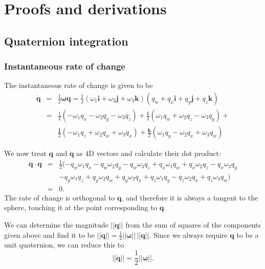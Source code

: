 \chapter{Proofs and derivations\label{proofs}}
\section{Quaternion integration\label{quatProofs}}
\subsection{Instantaneous rate of change\label{quatRateOfChangeOrthogonal}}
The instantaneous rate of change is given to be
\begin{eqnarray*}
\dot{\mathbf{q}} & = & \frac{1}{2}\bm{\omega}\mathbf{q} =
    \frac{1}{2}(\omega_1\mathbf{i} + \omega_2\mathbf{j} + \omega_3\mathbf{k})
    (q_w + q_x\mathbf{i} + q_y\mathbf{j} + q_z\mathbf{k}) \\
& = & \frac{1}{2} ( - \omega_1 q_x - \omega_2 q_y - \omega_3 q_z ) +
    \frac{\mathbf{i}}{2} ( \omega_1 q_w + \omega_2 q_z - \omega_3 q_y ) + \\
&&  \frac{\mathbf{j}}{2} (-\omega_1 q_z + \omega_2 q_w + \omega_3 q_x ) +
    \frac{\mathbf{k}}{2} ( \omega_1 q_y - \omega_2 q_x + \omega_3 q_w )
\end{eqnarray*}

We now treat $\mathbf{q}$ and $\dot{\mathbf{q}}$ as 4D vectors and calculate
their dot product:
\begin{eqnarray*}
\mathbf{q}\cdot\dot{\mathbf{q}} & = & \frac{1}{2} (
    - q_w \omega_1 q_x - q_w \omega_2 q_y - q_w \omega_3 q_z
    + q_x \omega_1 q_w + q_x \omega_2 q_z - q_x \omega_3 q_y \\
&&  - q_y \omega_1 q_z + q_y \omega_2 q_w + q_y \omega_3 q_x
    + q_z \omega_1 q_y - q_z \omega_2 q_x + q_z \omega_3 q_w ) \\
& = & 0.
\end{eqnarray*}
The rate of change is orthogonal to $\mathbf{q}$, and therefore it is always
a tangent to the sphere, touching it at the point corresponding to $\mathbf{q}$.

We can determine the magnitude $||\dot{\mathbf{q}}||$ from the sum of squares of the
components given above and find it to be
$||\dot{\mathbf{q}}|| = \frac{1}{2}||\bm{\omega}||\,||\mathbf{q}||$. Since we always
require $\mathbf{q}$ to be a unit quaternion, we can reduce this to
\begin{equation}
\label{quatRateOfChangeMagnitude}
||\dot{\mathbf{q}}|| = \frac{1}{2}||\bm{\omega}||.
\end{equation}

